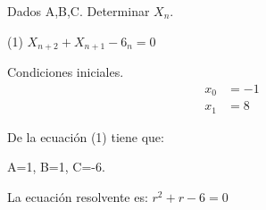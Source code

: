 \documentclass{article}
\begin{document}
Dados A,B,C. Determinar $X_n$.

\begin{center}
(1) $X_{n+2} + X_{n+1} - 6_n = 0$
\end{center}

Condiciones iniciales.
\begin{align*}
  x_0 &=-1\\
  x_1 &=8
\end{align*}

De la ecuación (1) tiene que:
\begin{center}
  A=1, B=1, C=-6.
\end{center}
La  ecuación resolvente es:
$r^2 + r -6=0$
\end{document}
